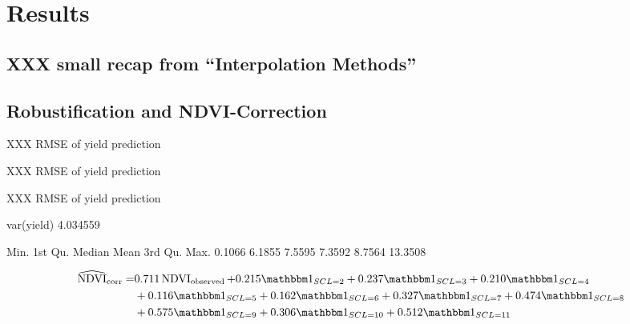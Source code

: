 \chapter{Results}
\section{XXX small recap from ``Interpolation Methods''}

\section{Robustification and NDVI-Correction}
\begin{table}
	\begin{center}
		\caption{XXX RMSE of yield prediction}
		\small
		
		\label{tab:methods_vs_yieldprediction}
		\normalsize
	\end{center}
\end{table}

\begin{table}
	\begin{center}
		\caption{XXX RMSE of yield prediction}
		\small
		
		\label{tab:methods_vs_yieldprediction}
		\normalsize
	\end{center}
\end{table}

\begin{table}
	\begin{center}
		\caption{XXX RMSE of yield prediction}
		\small
		
		\label{tab:methods_vs_yieldprediction}
		\normalsize
	\end{center}
\end{table}

var(yield) 4.034559

Min. 1st Qu.  Median    Mean 3rd Qu.    Max. 
0.1066  6.1855  7.5595  7.3592  8.7564 13.3508


\begin{equation}\label{eq:corr_lm}
	\begin{aligned}		
		\widehat{\operatorname{NDVI}}_{\text{corr}}  = &
		0.711 \operatorname{NDVI}_\text{observed}  + 0.215 \mathbbm 1_{{SCL = 2}} + 0.237 \mathbbm 1_{{SCL = 3}} + 0.210 \mathbbm 1_{{SCL = 4}} \\ &
		+ 0.116 \mathbbm 1_{{SCL = 5}} + 0.162 \mathbbm 1_{{SCL = 6}} + 0.327 \mathbbm 1_{{SCL = 7}} + 0.474 \mathbbm 1_{{SCL = 8}} \\ &
		 + 0.575 \mathbbm 1_{{SCL = 9}} + 0.306 \mathbbm 1_{{SCL = 10}} + 0.512 \mathbbm 1_{{SCL = 11}} 
	\end{aligned}
\end{equation}

